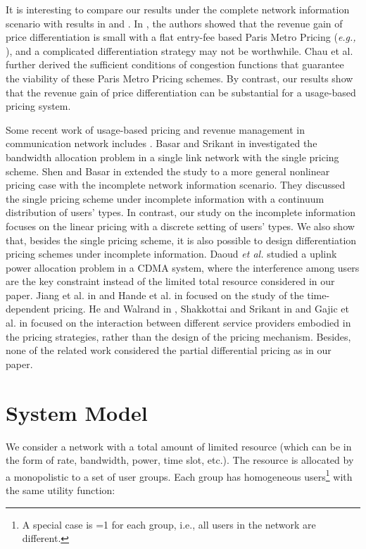 \documentclass[twocolumn,10pt,twosided]{IEEEtran}
\newcommand{\eg}{\emph{e.g., }}
\begin{document}
It is interesting to compare our results under the complete network information scenario with results in \cite{shakkottai2008price} and \cite{chau2010viability}. In \cite{shakkottai2008price}, the authors showed that the revenue gain of price differentiation is small with a flat entry-fee based  Paris Metro Pricing (\eg \cite{odlyzko1999paris}), and a complicated differentiation strategy may not be worthwhile. Chau et al.\cite{chau2010viability} further derived the sufficient conditions of congestion functions that guarantee the viability of these Paris Metro Pricing schemes.
By contrast, our results show that the revenue gain of price differentiation can be substantial for a usage-based pricing system.


Some recent work of usage-based pricing and revenue management in communication network includes \cite{basar2002revenue, shen2007optimal, daoud2008stackelberg, jiang2008time, hande2010pricing, he2005pricing,shakkottai2006economics, voja}. Basar and Srikant in \cite{basar2002revenue} investigated the bandwidth allocation problem in a single link network with the single pricing scheme. Shen and Basar in \cite{shen2007optimal} extended the study to a more general nonlinear pricing case with the incomplete network information scenario. They discussed the single pricing scheme under incomplete information with a continuum distribution of users' types. In contrast, our study on the incomplete information focuses on the linear pricing with a discrete setting of users' types. We also show that, besides the single pricing scheme, it is also possible to design differentiation pricing schemes under incomplete information. Daoud \emph{et al.}  \cite{daoud2008stackelberg} studied a uplink power allocation problem in a CDMA system, where the interference among users are the key constraint instead of the limited total resource considered in our paper.
Jiang et al. in \cite{jiang2008time} and Hande et al. in \cite{hande2010pricing}  focused on the study of the time-dependent pricing. He and Walrand in  \cite{he2005pricing},  Shakkottai and Srikant in \cite{shakkottai2006economics} and Gajic et al. in \cite{voja} focused on the interaction between different service providers embodied in the pricing strategies, rather than the design of the pricing mechanism. Besides, none of the related work considered the partial differential pricing as in our paper.



\section{System Model}
We consider a network with a total amount of  limited resource (which can be in the form of rate, bandwidth, power, time slot, etc.). The resource is allocated by a monopolistic  to a set  of user groups.  Each group  has  homogeneous users\footnote{A special case is =1 for each group, i.e., all users in the network are different.} with the same utility function:
\end{document}
